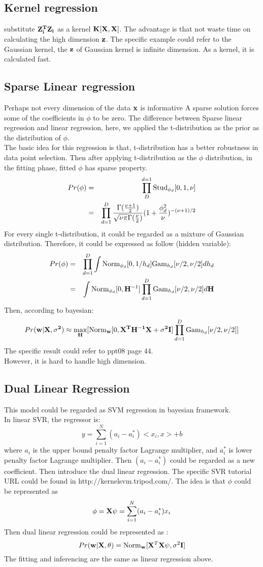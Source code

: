 \documentclass[12pt,a4paper]{article}
\begin{document}
\subsection*{Kernel regression}
substitute $\bf Z_i^TZ_i$ as a kernel ${\bf K[X,X]}$. The advantage is that not waste time on calculating the high dimension $\bf z$. The specific example could refer to the Gaussian kernel, the $\bf z$ of Gaussian kernel is infinite dimension. As a kernel, it is calculated fast.
\subsection*{Sparse Linear regression}
Perhaps not every dimension of the data $\bf x$ is informative
A sparse solution forces some of the coefficients in $\phi$ to be zero.
The difference between Sparse linear regression and linear regression, here, we applied the t-distribution as the prior as the distribution of $\phi$.\\
The basic idea for this regression is that, t-distribution has a better robustness in data point selection. Then after applying t-distribution as the $\phi$ distribution, in the fitting phase, fitted $\phi$ has sparse property. 
\begin{eqnarray*}
Pr(\phi) &=& \prod_{D}^{d=1}{\rm Stud}_{\phi_d}[0,1,\nu]\\
 &=& \prod_{d=1}^{D}\frac{\Gamma(\frac{\nu+1}{2})}{\sqrt{\nu\pi}\Gamma(\frac{\nu}{2})}(1+\frac{\phi^2_d}{\nu})^{-(\nu+1)/2}
\end{eqnarray*}
For every single t-distribution, it could be regarded as a mixture of Gaussian distribution. Therefore, it could be expressed as follow (hidden variable):
\begin{eqnarray*}
Pr(\phi) &=& \prod_{d=1}^{D}\int {\rm Norm}_{\phi_d}[0,1/h_d]{\rm Gam}_{h_d}[\nu/2,\nu/2]dh_d \\
&=& \int {\rm Norm}_{\phi_d}[0,{\bf H}^{-1}]\prod_{d=1}^{D}{\rm Gam}_{h_d}[\nu/2,\nu/2]d{\bf H}
\end{eqnarray*}
Then, according to bayesian:
$$
Pr({\bf w|X,\sigma^2}) \approx \max_{\bf H}[{\rm Norm}_{\bf w}[0,{\bf X^TH^{-1}X+\sigma^2I}]\prod_{d=1}^{D}{\rm Gam}_{h_d}[\nu/2,\nu/2]]
$$
The specific result could refer to ppt08 page 44.\\
However, it is hard to handle high dimension.
\subsection*{Dual Linear Regression}
This model could be regarded as SVM regression in bayesian framework.\\
In linear SVR, the regressor is:
$$
y = \sum_{i=1}^{N}(a_i-a_i^*)<x_i,x>+b
$$ 
where $a_i$ is the upper bound penalty factor Lagrange multiplier, and $a_i^*$ is lower penalty factor Lagrange multiplier. Then $(a_i-a_i^*)$ could be regarded as a new coefficient. Then introduce the dual linear regression. The specific SVR tutorial URL could be found in http://kernelsvm.tripod.com/.
The idea is that $\phi$ could be represented as
$$
\phi = {\bf X\psi} =  \sum_{i=1}^{N}(a_i-a_i^*)x_i
$$ 
Then dual linear regression could be represented as :
$$
Pr({\bf w|X,\theta}) = {\rm Norm}_{\bf w}[{\bf X}^T{\bf X\psi},\sigma^2{\bf I}]
$$
The fitting and inferencing are the same as linear regression above.
\end{document}
